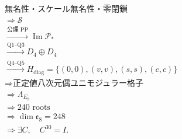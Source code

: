 \documentclass[
  a4paper,
  ja=minimal,
  xelatex,
  paragraph-mark={},
]{bxjsarticle}
\begin{document}
\[
\boxed{
\begin{aligned}
&\text{無名性・スケール無名性・零閉鎖}\\
&\Longrightarrow
\mathscr S\\
&\xrightarrow{\text{公理 PP}}
\operatorname{Im}\mathcal P_*\\
&\xrightarrow{\text{Q1--Q3}}
D_4\oplus D_4\\
&\xrightarrow{\text{Q4--Q5}}
H_{\mathrm{diag}}
{}=
\{(0,0),(v,v),(s,s),(c,c)\}\\
&\Longrightarrow
\text{正定値八次元偶ユニモジュラー格子}\\
&\Longrightarrow
\Lambda_{E_8}\\
&\Longrightarrow
240\text{ roots}\\
&\Longrightarrow
\dim\mathfrak e_8
{}=248\\
&\Longrightarrow
\exists C,\quad C^{30}=I.
\end{aligned}
}
\]
\end{document}

